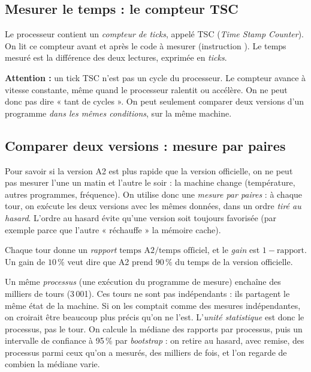 \subsection{Mesurer le temps : le compteur TSC}
Le processeur contient un \emph{compteur de ticks}, appelé TSC (\emph{Time Stamp Counter}). On lit ce compteur avant et après le code à mesurer (instruction ). Le temps mesuré est la différence des deux lectures, exprimée en \emph{ticks}.

\textbf{Attention :} un tick TSC n'est pas un cycle du processeur. Le compteur avance à vitesse constante, même quand le processeur ralentit ou accélère. On ne peut donc pas dire « tant de cycles ». On peut seulement comparer deux versions d'un programme \emph{dans les mêmes conditions}, sur la même machine.

\subsection{Comparer deux versions : mesure par paires}\label{sec:outil-paires}
Pour savoir si la version A2 est plus rapide que la version officielle, on ne peut pas mesurer l'une un matin et l'autre le soir : la machine change (température, autres programmes, fréquence). On utilise donc une \emph{mesure par paires} : à chaque tour, on exécute les deux versions avec les mêmes données, dans un ordre \emph{tiré au hasard}. L'ordre au hasard évite qu'une version soit toujours favorisée (par exemple parce que l'autre « réchauffe » la mémoire cache).

Chaque tour donne un \emph{rapport} $\text{temps A2}/\text{temps officiel}$, et le \emph{gain} est $1-\text{rapport}$. Un gain de $10\,\%$ veut dire que A2 prend $90\,\%$ du temps de la version officielle.

Un même \emph{processus} (une exécution du programme de mesure) enchaîne des milliers de tours (3\,001). Ces tours ne sont pas indépendants : ils partagent le même état de la machine. Si on les comptait comme des mesures indépendantes, on croirait être beaucoup plus précis qu'on ne l'est. L'\emph{unité statistique} est donc le processus, pas le tour. On calcule la médiane des rapports par processus, puis un intervalle de confiance à 95\,\% par \emph{bootstrap} : on retire au hasard, avec remise, des processus parmi ceux qu'on a mesurés, des milliers de fois, et l'on regarde de combien la médiane varie.

